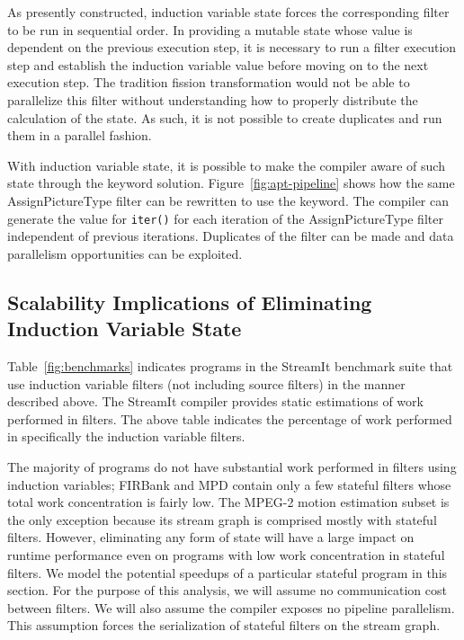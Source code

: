 As presently constructed, induction variable state for\-ces the
corresponding filter to be run in sequential order.  In providing a
mutable state whose value is dependent on the previous execution step,
it is necessary to run a filter execution step and establish the
induction variable value before moving on to the next execution step.
The tradition fission transformation would not be able to parallelize
this filter without understanding how to properly distribute the
calculation of the state.  As such, it is not possible 
to create duplicates and run them in a parallel fashion.  

With induction variable state, it is possible to make the 
compiler aware of such state through the keyword solution.  
Figure~\ref{fig:apt-pipeline} shows how the same AssignPictureType filter can be 
rewritten to use the keyword.  The compiler can generate the value
for {\tt iter()} for each iteration of the AssignPictureType filter independent
of previous iterations.  Duplicates of the filter can be made and
data parallelism opportunities can be exploited.


\subsection{Scalability Implications of Eliminating Induction Variable State}
\label{sec:model-analysis}

Table~\ref{fig:benchmarks} indicates programs in the StreamIt
benchmark suite that use induction variable filters (not including
source filters) in the manner described above.  The StreamIt compiler
provides static estimations of work performed in filters.  The above
table indicates the percentage of work performed in specifically the induction
variable filters.

The majority of programs do not have substantial work performed in
filters using induction variables; FIRBank and MPD contain only a few
stateful filters whose total work concentration is fairly low.  The
MPEG-2 motion estimation subset is the only exception because its
stream graph is comprised mostly with stateful filters.  However,
eliminating any form of state will have a large impact on runtime
performance even on programs with low work concentration in stateful
filters.  We model the potential speedups of a particular stateful
program in this section.  For the purpose of this analysis, we will
assume no communication cost between filters.  We will also assume the
compiler exposes no pipeline parallelism.  This assumption forces the
serialization of stateful filters on the stream graph.

